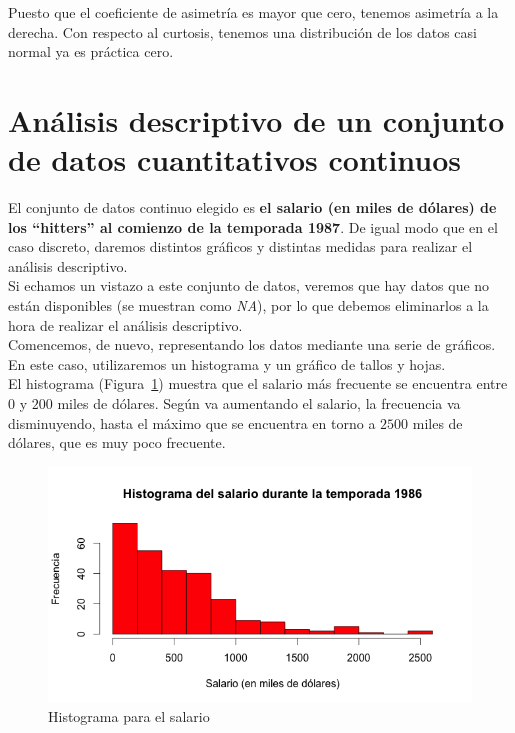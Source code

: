 \documentclass[12pt,a4paper,twoside,openright,titlepage,final]{article}
\begin{document}
Puesto que el coeficiente de asimetría es mayor que cero, tenemos asimetría a la derecha. Con respecto al curtosis, tenemos una distribución de los datos casi normal ya es práctica cero.

\newpage 

\section{Análisis descriptivo de un conjunto de datos cuantitativos continuos}

El conjunto de datos continuo elegido es \textbf{el salario (en miles de dólares) de los ``hitters'' al comienzo de la temporada 1987}. De igual modo que en el caso discreto, daremos distintos gráficos y distintas medidas para realizar el análisis descriptivo.\\

Si echamos un vistazo a este conjunto de datos, veremos que hay datos que no están disponibles (se muestran como \textit{NA}), por lo que debemos eliminarlos a la hora de realizar el análisis descriptivo.\\

Comencemos, de nuevo, representando los datos mediante una serie de gráficos. En este caso, utilizaremos un histograma y un gráfico de tallos y hojas.\\

El histograma (Figura~\ref{fig:histograma_salario}) muestra que el salario más frecuente se encuentra entre $0$ y $200$ miles de dólares. Según va aumentando el salario, la frecuencia va disminuyendo, hasta el máximo que se encuentra en torno a $2500$ miles de dólares, que es muy poco frecuente.\\ 

\begin{figure}[tbph!]
\centering
\includegraphics[width=0.8\linewidth]{imagenes/histograma_salario}
\caption{Histograma para el salario}
\label{fig:histograma_salario}
\end{figure}
\end{document}
